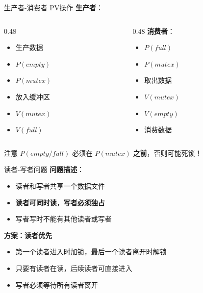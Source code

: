 \documentclass[10pt, aspectratio=169]{beamer}
\begin{document}
\begin{frame}{生产者-消费者 PV操作}
    \textbf{生产者}：
    \begin{columns}
        \begin{column}{0.48\textwidth}
            \begin{itemize}
                \item 生产数据
                \item $P(empty)$
                \item $P(mutex)$
                \item 放入缓冲区
                \item $V(mutex)$
                \item $V(full)$
            \end{itemize}
        \end{column}
        \begin{column}{0.48\textwidth}
            \textbf{消费者}：
            \begin{itemize}
                \item $P(full)$
                \item $P(mutex)$
                \item 取出数据
                \item $V(mutex)$
                \item $V(empty)$
                \item 消费数据
            \end{itemize}
        \end{column}
    \end{columns}
    \vspace{0.5em}
    \begin{alertblock}{注意}
        $P(empty/full)$ 必须在 $P(mutex)$ \textbf{之前}，否则可能死锁！
    \end{alertblock}
\end{frame}

\begin{frame}{读者-写者问题}
    \textbf{问题描述}：
    \begin{itemize}
        \item 读者和写者共享一个数据文件
        \item \textbf{读者可同时读}，\textbf{写者必须独占}
        \item 写者写时不能有其他读者或写者
    \end{itemize}
    \vspace{0.5em}
    \textbf{方案：读者优先}
    \begin{itemize}
        \item 第一个读者进入时加锁，最后一个读者离开时解锁
        \item 只要有读者在读，后续读者可直接进入
        \item 写者必须等待所有读者离开
    \end{itemize}
\end{frame}
\end{document}
